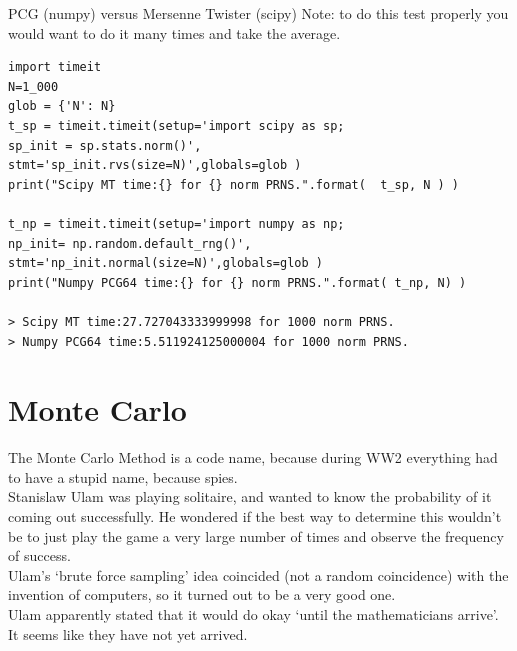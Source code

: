 \documentclass[10pt,sans,english,compress,xcolor=dvipsnames]{beamer}
\begin{document}
\begin{frame}[fragile]{PCG (numpy) versus Mersenne Twister (scipy)}
\footnotesize
Note: to do this test properly you would want to do it many times and take the average.\\
\notsotiny
\begin{verbatim}
import timeit
N=1_000
glob = {'N': N}
t_sp = timeit.timeit(setup='import scipy as sp; 
sp_init = sp.stats.norm()', 
stmt='sp_init.rvs(size=N)',globals=glob )
print("Scipy MT time:{} for {} norm PRNS.".format(  t_sp, N ) )

t_np = timeit.timeit(setup='import numpy as np; 
np_init= np.random.default_rng()', 
stmt='np_init.normal(size=N)',globals=glob )
print("Numpy PCG64 time:{} for {} norm PRNS.".format( t_np, N) )

> Scipy MT time:27.727043333999998 for 1000 norm PRNS.
> Numpy PCG64 time:5.511924125000004 for 1000 norm PRNS.
\end{verbatim}
\end{frame} 






\section{Monte Carlo}

\begin{frame}{The Monte Carlo Method}
\footnotesize
 is a code name, because during WW2 everything had to have a stupid name, because spies. \\[1ex]  

Stanislaw Ulam was playing solitaire, and wanted to know the probability of it coming out successfully. He wondered if the best way to determine this wouldn't be to just play the game a very large number of times and observe the frequency of success. \\[1ex]

Ulam's `brute force sampling' idea coincided (not a random coincidence) with the invention of computers, so it turned out to be a very good one. \\[1ex]

Ulam apparently stated that it would do okay `until the mathematicians arrive'. It seems like they have not yet arrived.\\
 
\end{frame} 
\end{document}
